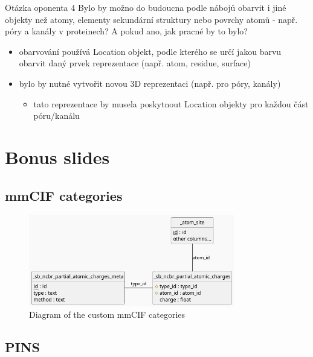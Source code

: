\documentclass[
]{beamer}
\begin{document}
\begin{frame}
  \begin{block}{Otázka oponenta 4}
    Bylo by možno do budoucna podle nábojů obarvit i jiné objekty než atomy, elementy sekundární struktury nebo povrchy atomů - např. póry a kanály v proteinech? A pokud ano, jak pracné by to bylo?
  \end{block}
  \begin{itemize}
    \item obarvování používá Location objekt, podle kterého se určí jakou barvu obarvit daný prvek reprezentace (např. atom, residue, surface)
    \item bylo by nutné vytvořit novou 3D reprezentaci (např. pro póry, kanály)
    \begin{itemize}
      \item tato reprezentace by musela poskytnout Location objekty pro každou část póru/kanálu
    \end{itemize}
  \end{itemize}
\end{frame}

\section[Bonus slides]{Bonus slides}

\subsection[mmCIF categories]{mmCIF categories}

\begin{frame}{}
  \begin{figure}
    \includegraphics[width=0.8\textwidth,keepaspectratio]{images/mmcif_erd.png}
    \caption{Diagram of the custom mmCIF categories}
  \end{figure}
\end{frame}

\subsection[PINS]{PINS}
\end{document}

